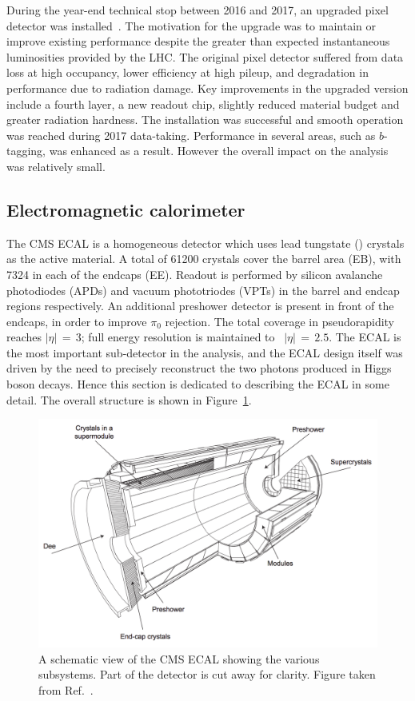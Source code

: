 During the year-end technical stop between 2016 and 2017, an upgraded pixel detector was installed~\cite{PixelUpgrade}.
The motivation for the upgrade was to maintain or improve existing performance despite the greater than expected instantaneous luminosities provided by the LHC.
The original pixel detector suffered from data loss at high occupancy, lower efficiency at high pileup, and degradation in performance due to radiation damage.
Key improvements in the upgraded version include a fourth layer, a new readout chip, slightly reduced material budget and greater radiation hardness.
The installation was successful and smooth operation was reached during 2017 data-taking.
Performance in several areas, such as $b$-tagging, was enhanced as a result.
However the overall impact on the \Hgg analysis was relatively small.

\subsection{Electromagnetic calorimeter}

The CMS ECAL is a homogeneous detector which uses lead tungstate (\pbw) crystals as the active material.
A total of 61200 crystals cover the barrel area (EB), with 7324 in each of the endcaps (EE).
Readout is performed by silicon avalanche photodiodes (APDs) and vacuum phototriodes (VPTs) in the barrel and endcap regions respectively.
An additional preshower detector is present in front of the endcaps, in order to improve $\pi_0$ rejection.
The total coverage in pseudorapidity reaches $|\eta|\,=\,3$; full energy resolution is maintained to ~$|\eta|\,=\,2.5$.
The ECAL is the most important sub-detector in the \Hgg analysis, 
and the ECAL design itself was driven by the need to precisely reconstruct the two photons produced in Higgs boson decays.
Hence this section is dedicated to describing the ECAL in some detail.
The overall structure is shown in Figure~\ref{fig:detector_ECALschematic}.

\begin{figure}[h!]
  \centering
  \includegraphics[width=\textwidth]{Figures/Detector/ECALschematic.png}
  \caption[Schematic view of the CMS ECAL.]
  {A schematic view of the CMS ECAL showing the various subsystems.
  Part of the detector is cut away for clarity.
  Figure taken from Ref.~\cite{ECALperformance}.}
  \label{fig:detector_ECALschematic}
\end{figure}

